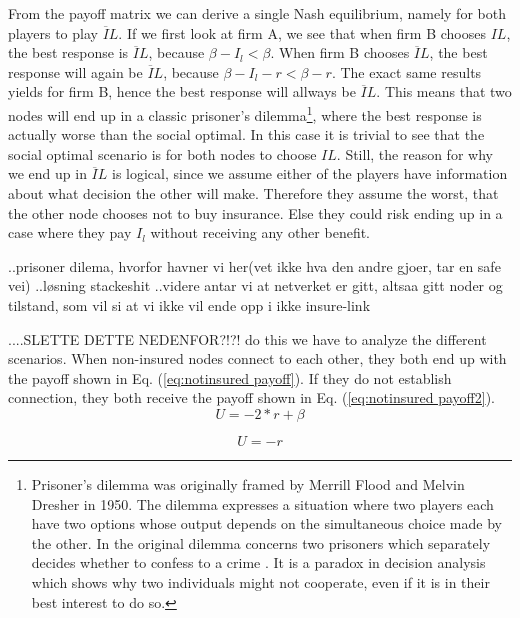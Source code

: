 From the payoff matrix we can derive a single Nash equilibrium, namely for both players to play $\overline{I}L$. If we first look at firm A, we see that when firm B chooses $IL$, the best response is $\overline{I}L$, because $ \beta - I_{l} < \beta$. When firm B chooses $\overline{I}L$, the best response will again be $\overline{I}L$, because $\beta - I_{l} - r < \beta - r $. 
The exact same results yields for firm B, hence the best response will allways be $\overline{I}L$. 
This means that two nodes will end up in a classic prisoner's dilemma\footnote{Prisoner's dilemma was originally framed by Merrill Flood and Melvin Dresher in 1950. The dilemma expresses a situation where two players each have two options whose output depends on the simultaneous choice made by the other. In the original dilemma concerns two prisoners which separately decides whether to confess to a crime \cite{oxfordPrisonersDilemma}. It is a paradox in decision analysis which shows why two individuals might not cooperate, even if it is in their best interest to do so.}, where the best response is actually worse than the social optimal. In this case it is trivial to see that the social optimal scenario is for both nodes to choose $IL$. Still, the reason for why we end up in $\overline{I}L$ is logical, since we assume either of the players have information about what decision the other will make. Therefore they assume the worst, that the other node chooses not to buy insurance. Else they could risk ending up in a case where they pay $I_{l}$ without receiving any other benefit. 
  
  
  ..prisoner dilema, hvorfor havner vi her(vet ikke hva den andre gjoer, tar en safe vei) 
  ..løsning stackeshit
  ..videre antar vi at netverket er gitt, altsaa gitt noder og tilstand, som vil si at vi ikke vil ende opp i ikke insure-link
  
....SLETTE DETTE NEDENFOR?!?!  
do this we have to analyze the different scenarios. 
When non-insured nodes connect to each other, they both end up with the payoff shown in Eq. (\ref{eq:notinsured payoff}). If they do not establish connection, they both receive the payoff shown in Eq. (\ref{eq:notinsured payoff2}).
\begin{equation}
U=- 2*r +\beta
\label{eq:notinsured payoff}
\end{equation}

\begin{equation}
U=- r
\label{eq:notinsured payoff2}
\end{equation}


